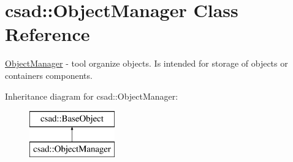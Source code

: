 \hypertarget{classcsad_1_1_object_manager}{\section{csad\-:\-:Object\-Manager Class Reference}
\label{classcsad_1_1_object_manager}
}


\hyperlink{classcsad_1_1_object_manager}{Object\-Manager} -\/ tool organize objects. Is intended for storage of objects or containers components.  


Inheritance diagram for csad\-:\-:Object\-Manager\-:\begin{figure}[H]
\begin{center}
\leavevmode
\includegraphics[height=2.000000cm]{classcsad_1_1_object_manager}
\end{center}
\end{figure}
